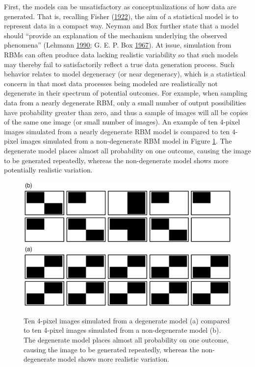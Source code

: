 \documentclass[12pt]{article}
\theoremstyle{definition}
\begin{document}
First, the models can be unsatisfactory as conceptualizations of how
data are generated. That is, recalling Fisher
(\protect\hyperlink{ref-fisher1922mathematical}{1922}), the aim of a
statistical model is to represent data in a compact way. Neyman and Box
further state that a model should ``provide an explanation of the
mechanism underlying the observed phenomena'' (Lehmann
\protect\hyperlink{ref-lehmann1990model}{1990}; G. E. P. Box
\protect\hyperlink{ref-box1967discrimination}{1967}). At issue,
simulation from RBMs can often produce data lacking realistic
variability so that such models may thereby fail to satisfactorily
reflect a true data generation process. Such behavior relates to model
degeneracy (or near degeneracy), which is a statistical concern in that
most data processes being modeled are realistically not degenerate in
their spectrum of potential outcomes. For example, when sampling data
from a nearly degenerate RBM, only a small number of output
possibilities have probability greater than zero, and thus a sample of
images will all be copies of the same one image (or small number of
images). An example of ten 4-pixel images simulated from a nearly
degenerate RBM model is compared to ten 4-pixel images simulated from a
non-degenerate RBM model in Figure \ref{fig:sample-models}. The
degenerate model places almost all probability on one outcome, causing
the image to be generated repeatedly, whereas the non-degenerate model
shows more potentially realistic variation. \par
\begin{figure}
\includegraphics[width=1\linewidth]{paper_files/figure-latex/sample-models-1} \includegraphics[width=1\linewidth]{paper_files/figure-latex/sample-models-2} \caption{Ten 4-pixel images simulated from a degenerate model (a) compared to ten 4-pixel images simulated from a non-degenerate model (b). The degenerate model places almost all probability on one outcome, causing the image to be generated repeatedly, whereas the non-degenerate model shows more realistic variation.}\label{fig:sample-models}
\end{figure}
\end{document}
